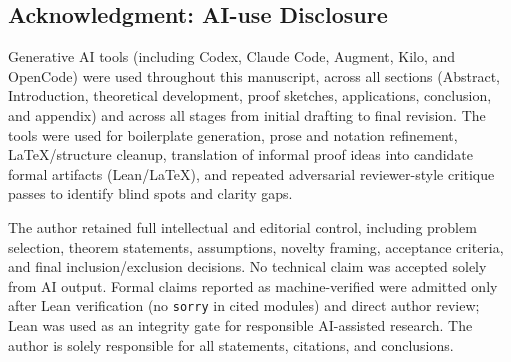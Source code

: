 \subsection*{Acknowledgment: AI-use Disclosure}

Generative AI tools (including Codex, Claude Code, Augment, Kilo, and OpenCode) were used throughout this manuscript, across all sections (Abstract, Introduction, theoretical development, proof sketches, applications, conclusion, and appendix) and across all stages from initial drafting to final revision. The tools were used for boilerplate generation, prose and notation refinement, \LaTeX{}/structure cleanup, translation of informal proof ideas into candidate formal artifacts (Lean/\LaTeX{}), and repeated adversarial reviewer-style critique passes to identify blind spots and clarity gaps.

The author retained full intellectual and editorial control, including problem selection, theorem statements, assumptions, novelty framing, acceptance criteria, and final inclusion/exclusion decisions. No technical claim was accepted solely from AI output. Formal claims reported as machine-verified were admitted only after Lean verification (no \texttt{sorry} in cited modules) and direct author review; Lean was used as an integrity gate for responsible AI-assisted research. The author is solely responsible for all statements, citations, and conclusions.
